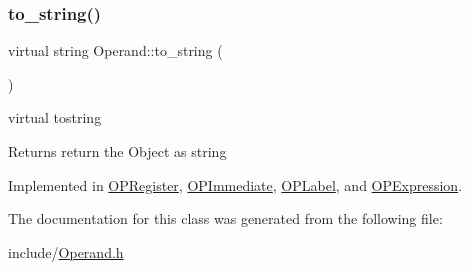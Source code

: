 \mbox{\label{class_operand_a28aed96d5fafee66be81c30c1435ad00}} 
\subsubsection{\texorpdfstring{to\+\_\+string()}{to\_string()}}
{\footnotesize\ttfamily virtual string Operand\+::to\+\_\+string (\begin{DoxyParamCaption}{ }\end{DoxyParamCaption})\hspace{0.3cm}{\ttfamily [pure virtual]}}



virtual tostring 

\begin{DoxyReturn}{Returns}
return the Object as string 
\end{DoxyReturn}


Implemented in \mbox{\hyperlink{class_o_p_register_a9f55bdff75224fb18973a9e913a4022f}{O\+P\+Register}}, \mbox{\hyperlink{class_o_p_immediate_a12bc613de3bff73ead8632dafd8050a0}{O\+P\+Immediate}}, \mbox{\hyperlink{class_o_p_label_a51c4e8f45422f03edcb71d472cf5e973}{O\+P\+Label}}, and \mbox{\hyperlink{class_o_p_expression_a0a6ee03eb083791028eeae021f4ff47b}{O\+P\+Expression}}.



The documentation for this class was generated from the following file\+:\begin{DoxyCompactItemize}
\item 
include/\mbox{\hyperlink{_operand_8h}{Operand.\+h}}\end{DoxyCompactItemize}
